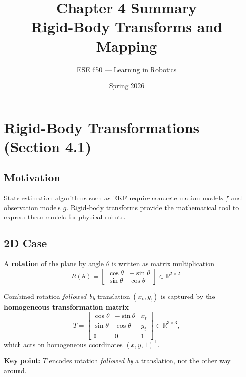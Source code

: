 \documentclass[12pt, a4paper]{article}
\title{\textbf{Chapter 4 Summary}\\[0.3em]
\large Rigid-Body Transforms and Mapping}
\author{ESE 650 --- Learning in Robotics}
\date{Spring 2026}
\begin{document}
\maketitle
\tableofcontents
\newpage

\section{Rigid-Body Transformations (Section 4.1)}

\subsection{Motivation}

State estimation algorithms such as EKF require concrete motion models
$f$ and observation models $g$. Rigid-body transforms provide the
mathematical tool to express these models for physical robots.

\subsection{2D Case}

A \textbf{rotation} of the plane by angle $\theta$ is written as matrix
multiplication
\begin{equation}
  R(\theta) = \begin{bmatrix} \cos\theta & -\sin\theta \\ \sin\theta & \cos\theta \end{bmatrix}
  \in \mathbb{R}^{2\times 2}.
  \label{eq:R2d}
\end{equation}

Combined rotation \emph{followed by} translation $(x_t, y_t)$ is
captured by the \textbf{homogeneous transformation matrix}
\begin{equation}
  T = \begin{bmatrix} \cos\theta & -\sin\theta & x_t \\
                      \sin\theta &  \cos\theta & y_t \\
                      0          &  0          & 1 \end{bmatrix}
  \in \mathbb{R}^{3\times 3},
  \label{eq:T2d}
\end{equation}
which acts on homogeneous coordinates $(x,y,1)^\top$.

\textbf{Key point:} $T$ encodes rotation \emph{followed by} a
translation, not the other way around.
\end{document}
